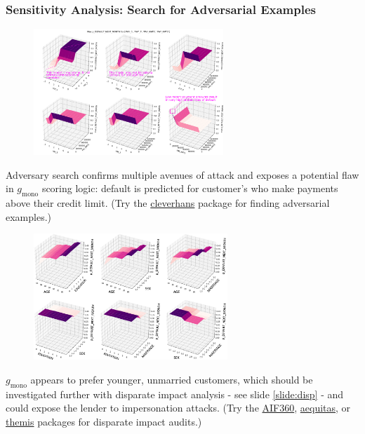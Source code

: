 \documentclass[11pt,
               aspectratio=169,
               hyperref={colorlinks}
               ]{beamer}
\begin{document}
			\begin{frame}[t, allowframebreaks]
				\vspace{-10pt}
				\frametitle{\textbf{Sensitivity Analysis}: Search for Adversarial Examples}
				\begin{figure}
					\begin{center}
						\includegraphics[height=135pt]{../img/sa_max_prob.png}
					\end{center}
				\end{figure}
				\tiny{Adversary search confirms multiple avenues of attack and exposes a potential flaw in $g_{\text{mono}}$ scoring logic: default is predicted for customer's who make payments above their credit limit. (Try the \href{https://github.com/tensorflow/cleverhans}{cleverhans} package for finding adversarial examples.)}
					
				\framebreak
				\vspace{-5pt}
				\begin{figure}
					\begin{center}
						\includegraphics[height=135pt]{../img/sa_max_prob_demo.png}
					\end{center}
				\end{figure}
				\vspace{-5pt}
				\tiny{$g_{\text{mono}}$ appears to prefer younger, unmarried customers, which should be investigated further with disparate impact analysis - see slide \ref{slide:disp} - and could expose the lender to impersonation attacks. (Try the \href{https://github.com/IBM/AIF360}{AIF360}, \href{https://github.com/dssg/aequitas}{aequitas}, or \href{https://github.com/LASER-UMASS/Themis}{themis} packages for disparate impact audits.)}
		
			\end{frame}			
			
\end{document}
